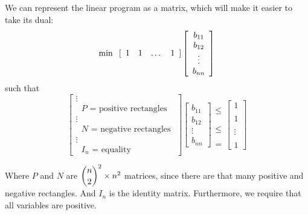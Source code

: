 \documentclass[11pt]{article}
\begin{document}
We can represent the linear program as a matrix, which will make it easier to take its dual:
\[ \min \hspace{.1in} [ \begin{array}{cccc} 1 & 1 & \dots & 1 \end{array} ] \left[\begin{array}{c} b_{11} \\ b_{12} \\ \vdots \\ b_{nn} \end{array} \right]\]
such that
\[ \left[ \begin{array}{c} \vdots \\ \text{ $P$ = positive rectangles } \\ \vdots \\ \text{ $N$ = negative rectangles } \\ \vdots \\ \text{ $I_n$ = equality } \end{array} \right] 
\left[\begin{array}{c} b_{11} \\ b_{12} \\ \vdots \\ b_{nn} \end{array} \right] 
\begin{array}{c} \\ \leq \\ \\ \\ \leq \\ \\ \\ = \end{array} 
\left[\begin{array}{c} 1 \\\\ 1 \\\\ \vdots \\\\ 1 \end{array} \right] \]

Where $P$ and $N$ are $\dbinom{n}{2}^2 \times n^2$ matrices, since there are that many positive and negative rectangles. And $I_n$ is the identity matrix. Furthermore, we require that all variables are positive. 
\end{document}

